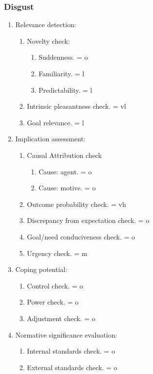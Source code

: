 \subsubsection{Disgust}

\begin{enumerate}
 \item  Relevance detection:
 \begin{enumerate}
  \item  Novelty check:
  \begin{enumerate}
   \item  Suddenness. = o
   \item  Familiarity. = l
   \item  Predictability. = l
  \end{enumerate}
  \item  Intrinsic pleasantness check. = vl
  \item  Goal relevance. = l
 \end{enumerate}
 \item  Implication assessment:
 \begin{enumerate}
  \item  Causal Attribution check
  \begin{enumerate}
   \item  Cause: agent. = o
   \item  Cause: motive. = o
  \end{enumerate}
  \item  Outcome probability check. = vh
  \item  Discrepancy from expectation check. = o
  \item  Goal/need conduciveness check. = o
  \item  Urgency check. = m
 \end{enumerate}
 \item  Coping potential:
 \begin{enumerate}
  \item  Control check. = o
  \item  Power check. = o
  \item  Adjustment check. = o
 \end{enumerate}
 \item  Normative significance evaluation:
 \begin{enumerate}
  \item  Internal standards check. = o
  \item  External standards check. = o
 \end{enumerate}
\end{enumerate}


